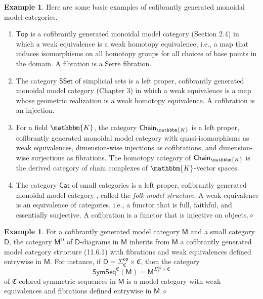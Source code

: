 \documentclass{amsbook}
\numberwithin{section}{chapter}
\numberwithin{subsection}{section}
\numberwithin{equation}{section}
\theoremstyle{plain}
\theoremstyle{definition}
\newtheorem{example}[equation]{Example}
\newcommand{\fieldk}{\mathbbm{K}}
\newcommand{\colorc}{\mathfrak{C}}
\newcommand{\op}{\mathsf{op}}
\newcommand{\D}{\mathsf{D}}
\newcommand{\M}{\mathsf{M}}
\newcommand{\dqed}{\hfill$\diamond$}
\newcommand{\Cat}{\mathsf{Cat}}
\newcommand{\Chaink}{\mathsf{Chain}_{\fieldk}}
\newcommand{\Sset}{\mathsf{SSet}}
\newcommand{\Top}{\mathsf{Top}}
\newcommand{\Sigmaop}{\Sigma^{\op}}
\newcommand{\Sigmacop}{\Sigmaop_{\colorc}}
\newcommand{\Sigmacopc}{\Sigmacop\times\colorc}
\newcommand{\symseq}{\mathsf{SymSeq}}
\newcommand{\symseqcm}{\symseq^{\colorc}(\M)}
\begin{document}
\begin{example}\label{ex:model-cate}
Here are some basic examples of cofibrantly generated monoidal model categories.
\begin{enumerate}\item $\Top$ is a cofibrantly generated monoidal model category \cite{hovey} (Section 2.4) in which a weak equivalence is a weak homotopy equivalence, i.e., a map that induces isomorphisms on all homotopy groups for all choices of base points in the domain.  A fibration is a Serre fibration. 
\item The category $\Sset$ of simplicial sets is a left proper, cofibrantly generated monoidal model category \cite{hovey} (Chapter 3) in which a weak equivalence is a map whose geometric realization is a weak homotopy equivalence.  A cofibration is an injection.
\item For a field $\fieldk$, the category $\Chaink$ is a left proper, cofibrantly generated monoidal  model category \cite{quillen} with quasi-isomorphisms as weak equivalences, dimension-wise injections as cofibrations, and dimension-wise surjections as fibrations.  The homotopy category of $\Chaink$ is the derived category of chain complexes of $\fieldk$-vector spaces. 
\item The category $\Cat$ of small categories is a left proper, cofibrantly generated monoidal model category \cite{rezk}, called the \emph{folk model structure}.  A weak equivalence is an equivalence of categories, i.e., a functor that is full, faithful, and essentially surjective.  A cofibration is a functor that is injective on objects.\dqed
\end{enumerate}\end{example}
 
\begin{example}\label{ex:cofgen-diagram}
For a cofibrantly generated model category $\M$ and a small category $\D$, the category $\M^{\D}$ of $\D$-diagrams in $\M$ inherits from $\M$ a cofibrantly generated model category structure \cite{hirschhorn} (11.6.1) with fibrations and weak equivalences defined entrywise in $\M$.  For instance, if $\D = \Sigmacopc$, then the category \[\symseqcm = \M^{\Sigmacopc}\] of $\colorc$-colored symmetric sequences in $\M$ is a model category with weak equivalences and fibrations defined entrywise in $\M$.\dqed\end{example}
\end{document}
